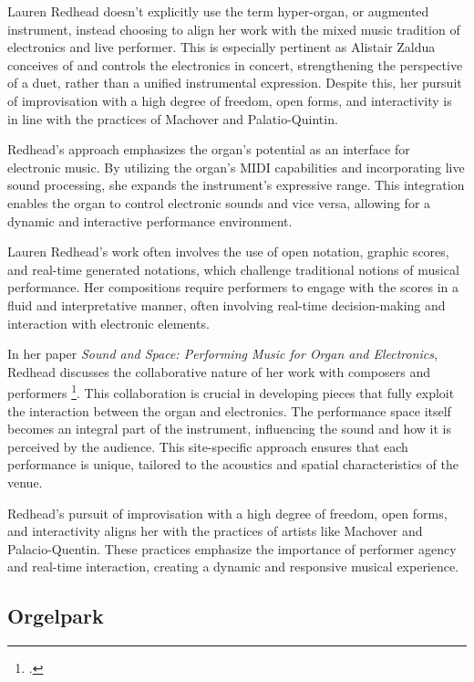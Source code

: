 \documentclass[12pt,twoside,maitrise]{dms_ks}
\theoremstyle{definition}
\begin{document}
{{Lauren Redhead doesn't explicitly use the term hyper-organ, or augmented instrument, instead choosing to align her work with the mixed music tradition of electronics and live performer. This is especially pertinent as Alistair Zaldua conceives of and controls the electronics in concert, strengthening the perspective of a duet, rather than a unified instrumental expression. Despite this, her pursuit of improvisation with a high degree of freedom, open forms, and interactivity is in line with the practices of Machover and Palatio-Quintin.

Redhead's approach emphasizes the organ's potential as an interface for electronic music. By utilizing the organ’s MIDI capabilities and incorporating live sound processing, she expands the instrument’s expressive range. This integration enables the organ to control electronic sounds and vice versa, allowing for a dynamic and interactive performance environment.

Lauren Redhead’s work often involves the use of open notation, graphic scores, and real-time generated notations, which challenge traditional notions of musical performance. Her compositions require performers to engage with the scores in a fluid and interpretative manner, often involving real-time decision-making and interaction with electronic elements.

In her paper \textit{Sound and Space: Performing Music for Organ and Electronics}, Redhead discusses the collaborative nature of her work with composers and performers \footcite[]{redhead_sound_2014}. This collaboration is crucial in developing pieces that fully exploit the interaction between the organ and electronics. The performance space itself becomes an integral part of the instrument, influencing the sound and how it is perceived by the audience. This site-specific approach ensures that each performance is unique, tailored to the acoustics and spatial characteristics of the venue.

Redhead’s pursuit of improvisation with a high degree of freedom, open forms, and interactivity aligns her with the practices of artists like Machover and Palacio-Quentin. These practices emphasize the importance of performer agency and real-time interaction, creating a dynamic and responsive musical experience.

\subsection{Orgelpark}

}}
\end{document}
